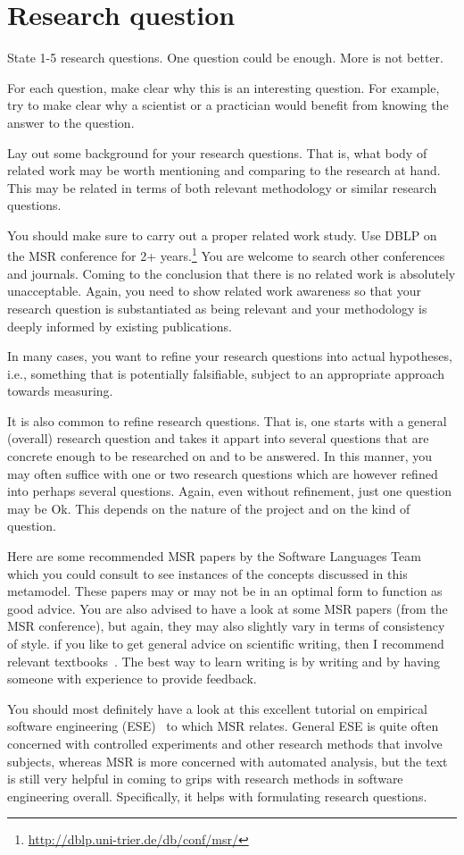 \section{Research question}

State 1-5 research questions. One question could be enough. More is
not better.

For each question, make clear why this is an interesting question. For
example, try to make clear why a scientist or a practician would
benefit from knowing the answer to the question.

Lay out some background for your research questions. That is, what
body of related work may be worth mentioning and comparing to the
research at hand. This may be related in terms of both relevant
methodology or similar research questions.

You should make sure to carry out a proper related work study. Use
DBLP on the MSR conference for 2+
years.\footnote{\url{http://dblp.uni-trier.de/db/conf/msr/}} You are
welcome to search other conferences and journals. Coming to the
conclusion that there is no related work is absolutely
unacceptable. Again, you need to show related work awareness so that
your research question is substantiated as being relevant and
your methodology is deeply informed by existing publications.

In many cases, you want to refine your research questions into actual
hypotheses, i.e., something that is potentially falsifiable, subject
to an appropriate approach towards measuring.

It is also common to refine research questions. That is, one starts
with a general (overall) research question and takes it appart into
several questions that are concrete enough to be researched on and to
be answered. In this manner, you may often suffice with one or two
research questions which are however refined into perhaps
several questions. Again, even without refinement, just one question may be
Ok. This depends on the nature of the project and on the kind of question.

Here are some recommended MSR papers by the Software Languages
Team~\cite{LaemmelLPV11,LaemmelP13,SchmorleizL15} which you could
consult to see instances of the concepts discussed in this
metamodel. These papers may or may not be in an optimal form to
function as good advice. You are also advised to have a look at some
MSR papers (from the MSR conference), but again, they may also
slightly vary in terms of consistency of style. if you like to get
general advice on scientific writing, then I recommend relevant
textbooks~\cite{Day98,Zobel09}. The best way to learn writing is by
writing and by having someone with experience to provide feedback.

You should most definitely have a look at this excellent tutorial on
empirical software engineering (ESE)~\cite{Easterbrook07} to which MSR
relates. General ESE is quite often concerned with controlled
experiments and other research methods that involve subjects, whereas
MSR is more concerned with automated analysis, but the text is still
very helpful in coming to grips with research methods in software
engineering overall. Specifically, it helps with formulating research questions.
